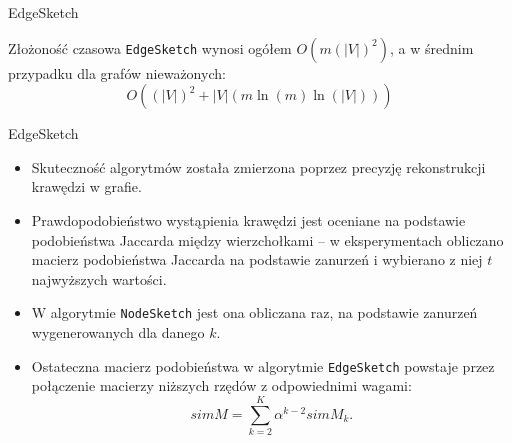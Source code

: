 \begin{frame}[squeeze]{EdgeSketch}
    \small
    \begin{algorithm}[H]
        \caption{EdgeSketch($\tilde{A},m$)}\label{alg:edge_sketch}
    \end{algorithm}

    \begin{definicja}
        Złożoność czasowa \texttt{EdgeSketch} wynosi ogółem $O(m(|V|)^2)$, a w średnim przypadku dla grafów nieważonych:
        \[
            O((|V|)^2 + |V|(m \ln(m) \ln(|V|)))
        \]
    \end{definicja}
\end{frame}

\begin{frame}[squeeze]{EdgeSketch}
    \begin{itemize}
        \item Skuteczność algorytmów została zmierzona poprzez precyzję rekonstrukcji krawędzi w grafie. 
        \item Prawdopodobieństwo wystąpienia krawędzi jest oceniane na podstawie podobieństwa Jaccarda między wierzchołkami -- w eksperymentach obliczano macierz podobieństwa Jaccarda na podstawie zanurzeń i wybierano z niej $t$ najwyższych wartości.
        \item W algorytmie \texttt{NodeSketch} jest ona obliczana raz, na podstawie zanurzeń wygenerowanych dla danego $k$.  
        \item Ostateczna macierz podobieństwa w algorytmie \texttt{EdgeSketch} powstaje przez połączenie macierzy niższych rzędów z odpowiednimi wagami:
        \[
            simM = \sum\limits_{k = 2}^{K} \alpha^{k-2} simM_{k}.
        \]
    \end{itemize}
\end{frame}